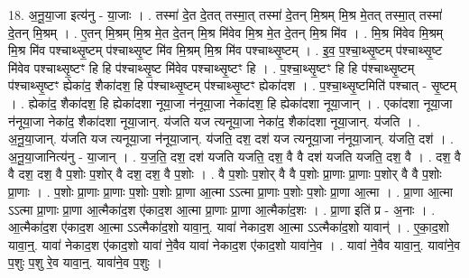 \documentclass[17pt]{extarticle}
\begin{document}
18. अ॒नू॒या॒जा इत्य॑नु - या॒जाः । . तस्मा॑ दे॒त दे॒तत् तस्मा॒त् तस्मा॑ दे॒तन् मि॒श्रम् मि॒श्र मे॒तत् तस्मा॒त् तस्मा॑ दे॒तन् मि॒श्रम् । . ए॒तन् मि॒श्रम् मि॒श्र मे॒त दे॒तन् मि॒श्र मि॑वेव मि॒श्र मे॒त दे॒तन् मि॒श्र मि॑व । . मि॒श्र मि॑वेव मि॒श्रम् मि॒श्र मि॑व पश्चाथ्सृ॒ष्टम् प॑श्चाथ्सृ॒ष्ट मि॑व मि॒श्रम् मि॒श्र मि॑व पश्चाथ्सृ॒ष्टम् । . इ॒व॒ प॒श्चा॒थ्सृ॒ष्टम् प॑श्चाथ्सृ॒ष्ट मि॑वेव पश्चाथ्सृ॒ष्टꣳ हि हि प॑श्चाथ्सृ॒ष्ट मि॑वेव पश्चाथ्सृ॒ष्टꣳ हि । . प॒श्चा॒थ्सृ॒ष्टꣳ हि हि प॑श्चाथ्सृ॒ष्टम् प॑श्चाथ्सृ॒ष्टꣳ ह्येका॑द॒ शैका॑दश॒ हि प॑श्चाथ्सृ॒ष्टम् प॑श्चाथ्सृ॒ष्टꣳ ह्येका॑दश । . प॒श्चा॒थ्सृ॒ष्टमिति॑ पश्चात् - सृ॒ष्टम् । . ह्येका॑द॒ शैका॑दश॒ हि ह्येका॑दशा नूया॒जा न॑नूया॒जा नेका॑दश॒ हि ह्येका॑दशा नूया॒जान् । . एका॑दशा नूया॒जा न॑नूया॒जा नेका॑द॒ शैका॑दशा नूया॒जान्. य॑जति यज त्यनूया॒जा नेका॑द॒ शैका॑दशा नूया॒जान्. य॑जति । . अ॒नू॒या॒जान्. य॑जति यज त्यनूया॒जा न॑नूया॒जान्. य॑जति॒ दश॒ दश॑ यज त्यनूया॒जा न॑नूया॒जान्. य॑जति॒ दश॑ । . अ॒नू॒या॒जानित्य॑नु - या॒जान् । . य॒ज॒ति॒ दश॒ दश॑ यजति यजति॒ दश॒ वै वै दश॑ यजति यजति॒ दश॒ वै । . दश॒ वै वै दश॒ दश॒ वै प॒शोः प॒शोर् वै दश॒ दश॒ वै प॒शोः । . वै प॒शोः प॒शोर् वै वै प॒शोः प्रा॒णाः प्रा॒णाः प॒शोर् वै वै प॒शोः प्रा॒णाः । . प॒शोः प्रा॒णाः प्रा॒णाः प॒शोः प॒शोः प्रा॒णा आ॒त्मा ऽऽत्मा प्रा॒णाः प॒शोः प॒शोः प्रा॒णा आ॒त्मा । . प्रा॒णा आ॒त्मा ऽऽत्मा प्रा॒णाः प्रा॒णा आ॒त्मैका॑द॒श ए॑काद॒श आ॒त्मा प्रा॒णाः प्रा॒णा आ॒त्मैका॑द॒शः । . प्रा॒णा इति॑ प्र - अ॒नाः । . आ॒त्मैका॑द॒श ए॑काद॒श आ॒त्मा ऽऽत्मैका॑द॒शो यावा॒न्॒. यावा॑ नेकाद॒श आ॒त्मा 
ऽऽत्मैका॑द॒शो यावान्॑ । . ए॒का॒द॒शो यावा॒न्॒. यावा॑ नेकाद॒श ए॑काद॒शो यावा॑ ने॒वैव यावा॑ नेकाद॒श ए॑काद॒शो यावा॑ने॒व । . यावा॑ ने॒वैव यावा॒न्॒. यावा॑ने॒व प॒शुः प॒शु रे॒व यावा॒न्॒. यावा॑ने॒व प॒शुः । \newline
\end{document}
